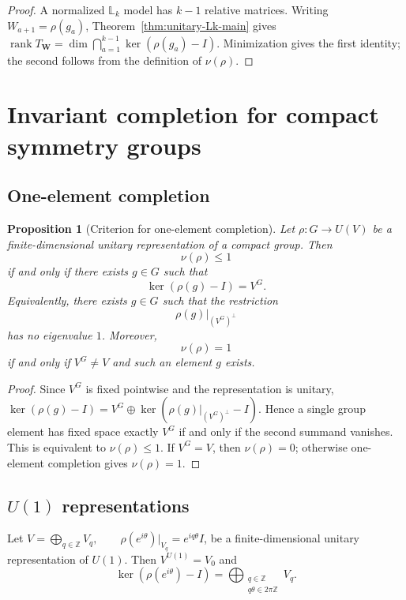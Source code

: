 \documentclass[11pt]{article}
\theoremstyle{plain}
\newtheorem{proposition}[theorem]{Proposition}
\theoremstyle{definition}
\begin{document}
\begin{proof}
A normalized \(\mathbb L_k\) model has \(k-1\) relative matrices. Writing
\(W_{a+1}=\rho(g_a)\),
Theorem~\ref{thm:unitary-Lk-main} gives
\(\operatorname{rank}T_{\mathbf W} = \dim\bigcap_{a=1}^{k-1}\ker(\rho(g_a)-I)\).
Minimization gives the first identity; the second follows from the definition of \(\nu(\rho)\).
\end{proof}
\section{Invariant completion for compact symmetry groups}
\label{sec:compact-completion}

\subsection{One-element completion}

\begin{proposition}[Criterion for one-element completion]
\label{prop:one-element-completion}
Let \(\rho:G\to U(V)\) be a finite-dimensional unitary representation of a compact group. Then
\[
  \nu(\rho)\leq1
\]
if and only if there exists \(g\in G\) such that
\[
  \ker(\rho(g)-I)=V^G.
\]
Equivalently, there exists \(g\in G\) such that the restriction
\[
  \rho(g)|_{(V^G)^\perp}
\]
has no eigenvalue \(1\). Moreover,
\[
  \nu(\rho)=1
\]
if and only if \(V^G\neq V\) and such an element \(g\) exists.
\end{proposition}

\begin{proof}
Since \(V^G\) is fixed pointwise and the representation is unitary,
\(\ker(\rho(g)-I) = V^G \oplus \ker\!\left( \rho(g)|_{(V^G)^\perp}-I \right)\).
Hence a single group element has fixed space exactly \(V^G\) if and only if
the second summand vanishes. This is equivalent to \(\nu(\rho)\leq1\). If
\(V^G=V\), then \(\nu(\rho)=0\); otherwise one-element completion gives
\(\nu(\rho)=1\).
\end{proof}

\subsection{\texorpdfstring{\(U(1)\)}{U(1)} representations}

Let
\(V=\bigoplus_{q\in\mathbb Z}V_q, \qquad \rho(e^{i\theta})|_{V_q}=e^{iq\theta}I\),
be a finite-dimensional unitary representation of \(U(1)\). Then \(V^{U(1)}=V_0\) and
\[
\ker(\rho(e^{i\theta})-I)
=
\bigoplus_{\substack{q\in\mathbb Z\\q\theta\in2\pi\mathbb Z}}V_q.
\]
\end{document}
